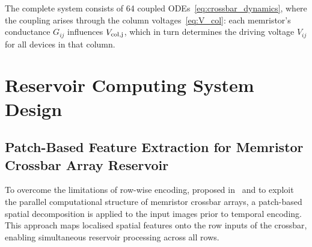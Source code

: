 \documentclass[11pt, oneside]{article}
\begin{document}
The complete system consists of 64 coupled ODEs~\eqref{eq:crossbar_dynamics}, where the coupling arises through the column voltages~\eqref{eq:V_col}: each memristor's conductance \(G_{ij}\) influences \(V_{\rm col,j}\), which in turn determines the driving voltage \(V_{ij}\) for all devices in that column.



\section{Reservoir Computing System Design}

\subsection{Patch-Based Feature Extraction for Memristor Crossbar Array Reservoir}








To overcome the limitations of row-wise encoding, proposed in~\autocite{Du2017} and to exploit the parallel computational structure of memristor crossbar arrays, a patch-based spatial decomposition is applied to the input images prior to temporal encoding. This approach maps localised spatial features onto the row inputs of the crossbar, enabling simultaneous reservoir processing across all rows.
\end{document}
